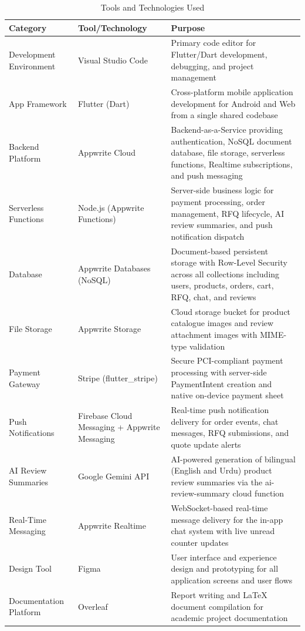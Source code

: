 \begin{table}[H]
\centering
\caption{Tools and Technologies Used}
\label{tab:basic_tools_technologies}
\begin{tabular}{|p{4cm}|p{4cm}|p{6cm}|}
\hline
\textbf{Category} & \textbf{Tool/Technology} & \textbf{Purpose} \\
\hline
Development Environment & Visual Studio Code & Primary code editor for Flutter/Dart development, debugging, and project management \\
\hline
App Framework & Flutter (Dart) & Cross-platform mobile application development for Android and Web from a single shared codebase \\
\hline

\hline
Backend Platform & Appwrite Cloud & Backend-as-a-Service providing authentication, NoSQL document database, file storage, serverless functions, Realtime subscriptions, and push messaging \\
\hline
Serverless Functions & Node.js (Appwrite Functions) & Server-side business logic for payment processing, order management, RFQ lifecycle, AI review summaries, and push notification dispatch \\
\hline
Database & Appwrite Databases (NoSQL) & Document-based persistent storage with Row-Level Security across all collections including users, products, orders, cart, RFQ, chat, and reviews \\
\hline
File Storage & Appwrite Storage & Cloud storage bucket for product catalogue images and review attachment images with MIME-type validation \\
\hline
Payment Gateway & Stripe (flutter\_stripe) & Secure PCI-compliant payment processing with server-side PaymentIntent creation and native on-device payment sheet \\
\hline
Push Notifications & Firebase Cloud Messaging + Appwrite Messaging & Real-time push notification delivery for order events, chat messages, RFQ submissions, and quote update alerts \\
\hline
AI Review Summaries & Google Gemini API & AI-powered generation of bilingual (English and Urdu) product review summaries via the ai-review-summary cloud function \\
\hline
Real-Time Messaging & Appwrite Realtime & WebSocket-based real-time message delivery for the in-app chat system with live unread counter updates \\
\hline
Design Tool & Figma & User interface and experience design and prototyping for all application screens and user flows \\

\hline
Documentation Platform & Overleaf & Report writing and LaTeX document compilation for academic project documentation \\
\hline
\end{tabular}
\end{table}
